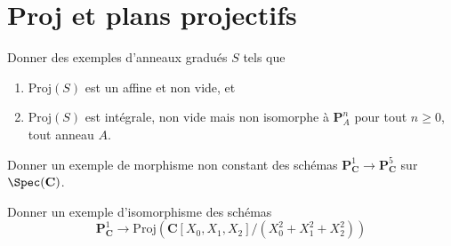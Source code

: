 \section{Proj et plans projectifs}
\label{section-proj}

\begin{exercise}
\label{exercise-graded-ring-specified-result}
Donner des exemples d'anneaux gradués $S$ tels que
\begin{enumerate}
\item $\text{Proj}(S)$ est un affine et non vide, et
\item $\text{Proj}(S)$ est intégrale, non vide mais non isomorphe à
${\mathbf P}^n_A$ pour tout $n\geq 0$, tout anneau $A$.
\end{enumerate}
\end{exercise}

\begin{exercise}
\label{exercise-nonconstant-morphism-proj}
Donner un exemple de morphisme non
constant des schémas ${\mathbf P}^1_{\mathbf C} \to {\mathbf P}^5_{\mathbf C}$
sur $\Spec({\mathbf C})$.
\end{exercise}

\begin{exercise}
\label{exercise-isomorphism-P1-conic}
Donner un exemple d'isomorphisme des schémas
$$
{\mathbf P}^1_{\mathbf C} \to
\text{Proj}({\mathbf C}[X_0, X_1, X_2]/(X_0^2 + X_1^2 + X_2^2))
$$
\end{exercise}

